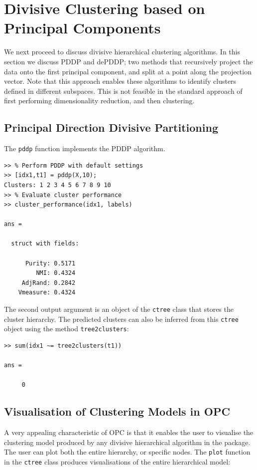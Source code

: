 \documentclass{book}
\begin{document}
\section{Divisive Clustering based on Principal Components}

We next proceed to discuss divisive hierarchical clustering algorithms.
%
In this section we discuss PDDP and dePDDP; two methods
that recursively project the data onto the first principal component, and split
at a point along the projection vector.
%
Note that this approach enables these algorithms to
identify clusters defined in different subspaces. This is not feasible in
the standard approach of first performing dimensionality
reduction, and then clustering.

\subsection{Principal Direction Divisive Partitioning}

The {\tt pddp} function implements the PDDP algorithm.

\begin{verbatim}
>> % Perform PDDP with default settings
>> [idx1,t1] = pddp(X,10);
Clusters: 1 2 3 4 5 6 7 8 9 10
>> % Evaluate cluster performance
>> cluster_performance(idx1, labels)

ans = 

  struct with fields:

      Purity: 0.5171
         NMI: 0.4324
     AdjRand: 0.2842
    Vmeasure: 0.4324

\end{verbatim}

\noindent
%
The second output argument is an object of the {\tt ctree} class that stores the
cluster hierarchy.
%
The predicted clusters can also be inferred from this {\tt ctree} object using the
method {\tt tree2clusters}:

\begin{verbatim}
>> sum(idx1 ~= tree2clusters(t1))

ans = 

     0

\end{verbatim}


\subsection{Visualisation of Clustering Models in OPC}

\noindent
%
A very appealing characteristic of OPC is that it enables the user to visualise
the clustering model produced by any divisive hierarchical algorithm in the
package. The user can plot both the entire hierarchy, or specific nodes. The
{\tt plot} function in the {\tt ctree} class produces visualisations of the
entire hierarchical model:
\end{document}
